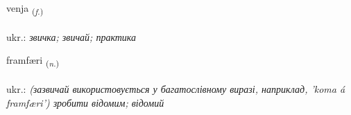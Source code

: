 \documentclass[frontgrid, backgrid]{flacards}\usepackage[]{graphicx}\usepackage[]{xcolor}
\begin{document}
\renewcommand{\flhead}{\vskip5pt \fboxsep=0pt {\small\bfseries\footnotesize Nafnorð | іменник}}
\renewcommand{\fcfoot}{\vskip5pt \fboxsep=0pt \hspace{2pt}{\small\bfseries\footnotesize 2K}}

\renewcommand{\blhead}{\vskip5pt {\small\bfseries\footnotesize Nafnorð | іменник }}
\renewcommand{\bcfoot}{\vskip5pt \hspace{2pt}{\small\bfseries\footnotesize 2K}}


{venja \small{\textsubscript{(\textit{f.})}} \\[1ex] %
\textphonetic{[vɛnja]} \\
ukr.: \emph{звичка; звичай; практика} \\  [2ex]
\renewcommand*{\arraystretch}{0.8}
}

\renewcommand{\flhead}{\vskip5pt \fboxsep=0pt {\small\bfseries\footnotesize Nafnorð | іменник}}
\renewcommand{\fcfoot}{\vskip5pt \fboxsep=0pt \hspace{2pt}{\small\bfseries\footnotesize 2K}}

\renewcommand{\blhead}{\vskip5pt {\small\bfseries\footnotesize Nafnorð | іменник }}
\renewcommand{\bcfoot}{\vskip5pt \hspace{2pt}{\small\bfseries\footnotesize 2K}}


{framfæri \small{\textsubscript{(\textit{n.})}} \\[1ex] %
\textphonetic{[framfairɪ]} \\
ukr.: \emph{(зазвичай використовується у багатослівному виразі, наприклад, 'koma á framfæri') зробити відомим; відомий} \\  [2ex]
\renewcommand*{\arraystretch}{0.8}
}
\end{document}
